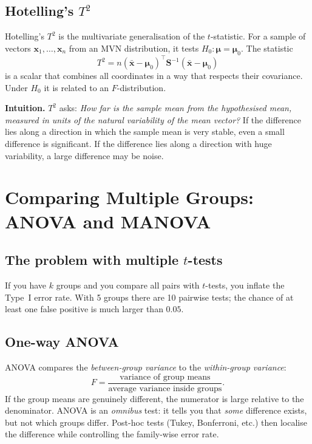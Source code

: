 \documentclass[11pt,a4paper]{article}
\newcommand{\vect}[1]{\mathbf{#1}}
\newcommand{\mat}[1]{\mathbf{#1}}
\begin{document}
\subsection{Hotelling's $T^2$}
Hotelling's $T^2$ is the multivariate generalisation of the
$t$-statistic.  For a sample of vectors $\vect{x}_1,\dots,\vect{x}_n$
from an MVN distribution, it tests $H_0:\boldsymbol{\mu}=\boldsymbol{\mu}_0$.
The statistic
\[
T^2 = n(\bar{\vect{x}}-\boldsymbol{\mu}_0)^\top
\mat{S}^{-1}(\bar{\vect{x}}-\boldsymbol{\mu}_0)
\]
is a scalar that combines all coordinates in a way that respects
their covariance.  Under $H_0$ it is related to an $F$-distribution.

\textbf{Intuition.}  $T^2$ asks: \emph{How far is the sample mean from
the hypothesised mean, measured in units of the natural variability
of the mean vector?}  If the difference lies along a direction in
which the sample mean is very stable, even a small difference is
significant.  If the difference lies along a direction with huge
variability, a large difference may be noise.

\section{Comparing Multiple Groups: ANOVA and MANOVA}

\subsection{The problem with multiple $t$-tests}
If you have $k$ groups and you compare all pairs with $t$-tests, you
inflate the Type~I error rate.  With 5 groups there are 10 pairwise
tests; the chance of at least one false positive is much larger than
$0.05$.

\subsection{One-way ANOVA}
ANOVA compares the \emph{between-group variance} to the
\emph{within-group variance}:
\[
F = \frac{\text{variance of group means}}{\text{average variance inside groups}}.
\]
If the group means are genuinely different, the numerator is large
relative to the denominator.  ANOVA is an \emph{omnibus} test: it
tells you that \emph{some} difference exists, but not which groups
differ.  Post-hoc tests (Tukey, Bonferroni, etc.) then localise the
difference while controlling the family-wise error rate.
\end{document}

